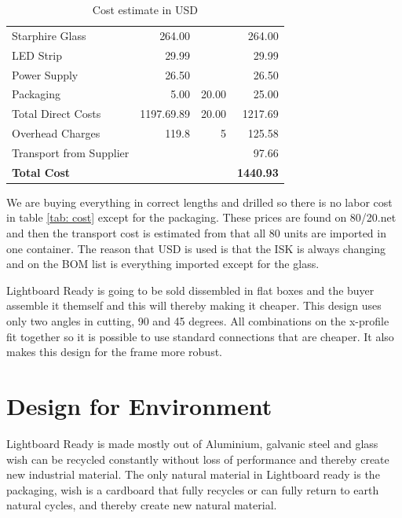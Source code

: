 \documentclass[a4paper]{jpconf}
\begin{document}
\begin{table}[]
\begin{tabular}{lrr|r}
			Starphire Glass & 264.00 & & 264.00 \\
			LED Strip & 29.99 & & 29.99 \\
			Power Supply & 26.50 & & 26.50\\
			Packaging & 5.00 & 20.00 & 25.00 \\ \hline
			Total Direct Costs & 1197.69.89 & 20.00 & 1217.69 \\
			Overhead Charges & 119.8  & 5 & 125.58 \\
			Transport from Supplier & & & 97.66 \\
			\textbf{Total Cost} &   &  & \textbf{1440.93} \\ \hline
		\end{tabular}
		\caption{Cost estimate in USD \cite{8020} \cite{ispan}}
		\label{tab:cost}
	\end{table}
	
	We are buying everything in correct lengths and drilled so there is no labor cost in table \ref{tab: cost} except for the packaging.
	These prices are found on 80/20.net and then the transport cost is estimated from that all 80 units are imported in one container.
	The reason that USD is used is that the ISK is always changing and on the BOM list is everything imported except for the glass. 
	
	Lightboard Ready is going to be sold dissembled  %
	in flat boxes and the buyer %
	assemble it themself and 
	this will %
	thereby making it cheaper.
	This design uses only two angles in cutting, 90 and 45 degrees.
	All combinations on the x-profile fit together so it is possible to use standard connections that are cheaper.
	It also makes this design for the frame more robust.
	\section{Design for Environment}
	
	
	Lightboard Ready is made mostly out of Aluminium, galvanic steel and glass wish can be recycled constantly without loss of performance and thereby create new industrial material.
	The only natural material in Lightboard ready is the packaging, wish is a cardboard that fully recycles or can fully return to earth natural cycles, and thereby create new natural material.
	
\end{document}
